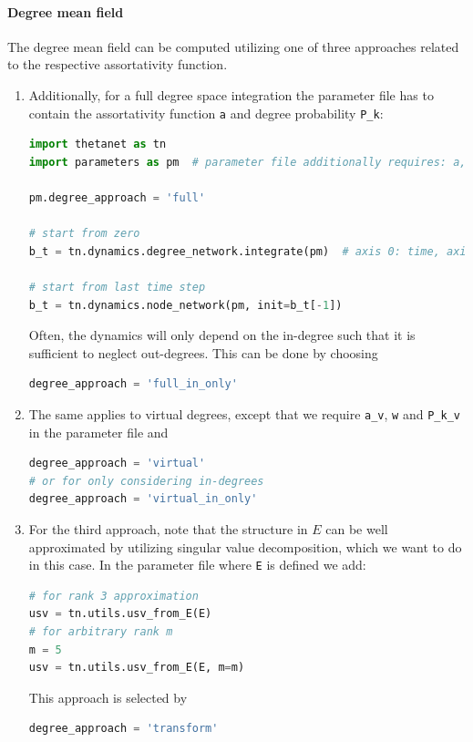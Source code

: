 \documentclass[bibliography=totoc, twoside]{article}
\numberwithin{equation}{section}
\begin{document}
\paragraph*{Degree mean field}
The degree mean field can be computed utilizing one of three approaches related to the respective assortativity function.
\begin{enumerate}
    \item Additionally, for a full degree space integration the parameter file has to contain the assortativity function \texttt{a} and degree probability \texttt{P\_k}:
\begin{lstlisting}[language=python]
import thetanet as tn
import parameters as pm  # parameter file additionally requires: a, P_k

pm.degree_approach = 'full'

# start from zero
b_t = tn.dynamics.degree_network.integrate(pm)  # axis 0: time, axis 1: degrees

# start from last time step
b_t = tn.dynamics.node_network(pm, init=b_t[-1])
\end{lstlisting}
    Often, the dynamics will only depend on the in-degree such that it is sufficient to neglect out-degrees.
    This can be done by choosing
\begin{lstlisting}[language=python]
degree_approach = 'full_in_only'
\end{lstlisting}

    \item The same applies to virtual degrees, except that we require \texttt{a\_v}, \texttt{w} and \texttt{P\_k\_v} in the parameter file and
\begin{lstlisting}[language=python]
degree_approach = 'virtual'
# or for only considering in-degrees
degree_approach = 'virtual_in_only'
\end{lstlisting}

    \item For the third approach, note that the structure in $E$ can be well approximated by utilizing singular value decomposition, which we want to do in this case.
In the parameter file where \texttt{E} is defined we add:
\begin{lstlisting}[language=python]
# for rank 3 approximation
usv = tn.utils.usv_from_E(E)
# for arbitrary rank m
m = 5
usv = tn.utils.usv_from_E(E, m=m)
\end{lstlisting}
    This approach is selected by
\begin{lstlisting}[language=python]
degree_approach = 'transform'
\end{lstlisting}
\end{enumerate}
\end{document}
